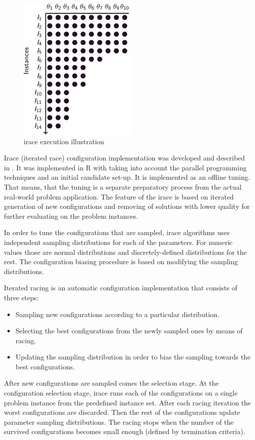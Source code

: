 \documentclass[12pt,a4paper,oneside]{book}
\begin{document}
\begin{figure}
  \centering
    \includegraphics{irace.jpg}
  \caption{irace execution illustration}
  \label{fig:irace}
\end{figure}


Irace (iterated race) configuration implementation was developed and described in \cite{LopDubStuBir2011:techreport-004}. It was implemented in R with taking into account the parallel programming techniques and an initial candidate set-up. It is implemented as an offline tuning. That means, that the tuning is a separate preparatory process from the actual real-world problem application. The feature of the irace is based on iterated generation of new configurations and removing of solutions with lower quality for further evaluating on the problem instances.

In order to tune the configurations that are sampled, irace algorithms uses independent sampling distributions for each of the parameters. For numeric values those are normal distributions and discretely-defined distributions for the rest. The configuration biasing procedure is based on modifying the sampling distributions.

Iterated racing is an automatic configuration implementation that consists of three steps:

\begin{itemize}
\item Sampling new configurations according to a particular distribution.
\item Selecting the best configurations from the newly sampled ones by means of racing.
\item Updating the sampling distribution in order to bias the sampling towards the best configurations.
\end{itemize}

After new configurations are sampled comes the selection stage. At the configuration selection stage, irace runs each of the configurations on a single problem instance from the predefined instance set. After each racing iteration the worst configurations are discarded. Then the rest of the configurations update parameter sampling distributions. The racing stops when the number of the survived configurations becomes small enough (defined by termination criteria).
\end{document}
